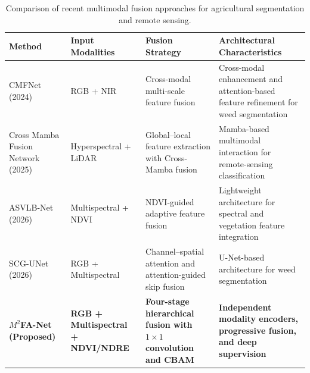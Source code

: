 \documentclass[pdflatex,sn-mathphys-num]{sn-jnl}
\begin{document}
\begin{table}[t]
\color{darkblue}
\centering
\small
\setlength{\tabcolsep}{4pt}
\renewcommand{\arraystretch}{1.3}

\caption{Comparison of recent multimodal fusion approaches
for agricultural segmentation and remote sensing.}
\label{tab:fusion_comparison}

\begin{tabular}{p{}
                p{}
                p{}
                p{}}
\hline
\textbf{Method} &
\textbf{Input Modalities} &
\textbf{Fusion Strategy} &
\textbf{Architectural Characteristics} \\
\hline

CMFNet (2024)\cite{fan2024cmfnet}
& RGB + NIR
& Cross-modal multi-scale feature fusion
& Cross-modal enhancement and attention-based
feature refinement for weed segmentation \\

\hline

Cross Mamba Fusion Network (2025)\cite{cmfnet2025mamba}
& Hyperspectral + LiDAR
& Global--local feature extraction with
Cross-Mamba fusion
& Mamba-based multimodal interaction for
remote-sensing classification \\

\hline

ASVLB-Net (2026)\cite{dong2026asvlb}
& Multispectral + NDVI
& NDVI-guided adaptive feature fusion
& Lightweight architecture for spectral
and vegetation feature integration \\

\hline

SCG-UNet (2026)\cite{li2026scgunet}
& RGB + Multispectral
& Channel--spatial attention and
attention-guided skip fusion
& U-Net-based architecture for
weed segmentation \\

\hline

\textbf{$M^2$FA-Net (Proposed)}
& \textbf{RGB + Multispectral + NDVI/NDRE}
& \textbf{Four-stage hierarchical fusion
with $1\times1$ convolution and CBAM}
& \textbf{Independent modality encoders,
progressive fusion, and deep supervision} \\

\hline
\end{tabular}
\end{table}
\end{document}
